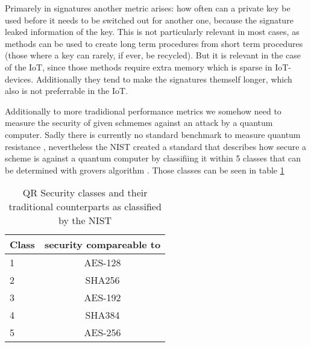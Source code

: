 \documentclass[conference]{IEEEtran}
\begin{document}
Primarely in signatures another metric arises: how often can a private key be used before it needs to be switched out for another one, because the signature leaked information of the key.
This is not particularly relevant in most cases, as methods can be used to create long term procedures from short term procedures (those where a key can rarely, if ever, be recycled).
But it is relevant in the case of the IoT, since those methods require extra memory which is sparse in IoT-devices. Additionally they tend to make the signatures themself longer, which also is not preferrable in the IoT. \cite{QR_algs}

Additionally to more tradidional performance metrics we somehow need to measure the security of given schmemes against an attack by a quantum computer.
Sadly there is currently no standard benchmark to measure quantum resistance \cite{QR_comparison}, nevertheless the NIST created a standard that describes how secure a scheme is against a quantum computer by classifiing it within 5 classes that can be determined with grovers algorithm \cite{QR_Iot_Lattice,Energy_comp}.
Those classes can be seen in table \ref{QR-classes}

\begin{table}
    \label{QR-classes}
    \caption{QR Security classes and their traditional counterparts as classified by the NIST}
    \begin{tabular}{l | c}
        Class & security compareable to \\
        \hline
        1 & AES-128 \\
        2 & SHA256 \\
        3 & AES-192 \\
        4 & SHA384 \\
        5 & AES-256 \\
    \end{tabular} 
\end{table}
\end{document}
